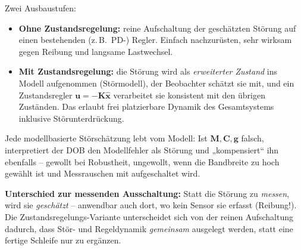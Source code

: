 Zwei Ausbaustufen:
\begin{itemize}
\item \textbf{Ohne Zustandsregelung:} reine Aufschaltung der geschätzten Störung
  auf einen bestehenden (z.\,B.\ PD-) Regler. Einfach nachzurüsten, sehr wirksam
  gegen Reibung und langsame Lastwechsel.
\item \textbf{Mit Zustandsregelung:} die Störung wird als \emph{erweiterter
  Zustand} ins Modell aufgenommen (Störmodell), der Beobachter schätzt sie
  mit, und ein Zustandsregler $\bm{u} = -\bm{K}\hat{\bm{x}}$ verarbeitet sie
  konsistent mit den übrigen Zuständen. Das erlaubt frei platzierbare Dynamik des
  Gesamtsystems inklusive Störunterdrückung.
\end{itemize}
\begin{warnbox}[title=Voraussetzung und Grenze]
Jede modellbasierte Störschätzung lebt vom Modell: Ist $\bm{M},\bm{C},\bm{g}$
falsch, interpretiert der DOB den Modellfehler als Störung und „kompensiert`` ihn
ebenfalls -- gewollt bei Robustheit, ungewollt, wenn die Bandbreite zu hoch
gewählt ist und Messrauschen mit aufgeschaltet wird.
\end{warnbox}
\textbf{Unterschied zur messenden Ausschaltung:} Statt die Störung zu
\emph{messen}, wird sie \emph{geschätzt} -- anwendbar auch dort, wo kein Sensor
sie erfasst (Reibung!). Die Zustandsregelungs-Variante unterscheidet sich von der
reinen Aufschaltung dadurch, dass Stör- und Regeldynamik \emph{gemeinsam}
ausgelegt werden, statt eine fertige Schleife nur zu ergänzen.

